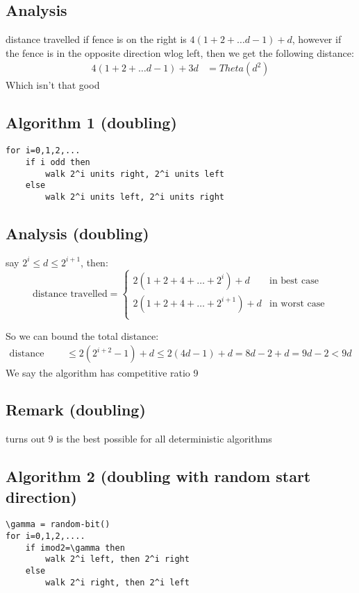 \documentclass[english,12pt]{article}
\theoremstyle{plain}
\theoremstyle{definition}
\theoremstyle{definition} %
\begin{document}
\subsection{Analysis}
distance travelled if fence is on the right is $4(1+2+\ldots d-1) +d$, however if the fence is in the opposite direction wlog left, then we get the following distance:
\begin{align*}
4(1+2+\ldots d-1) +3d &=Theta(d^2)
\end{align*}
Which isn't that good

\subsection{Algorithm 1 (doubling)}
\begin{verbatim}
for i=0,1,2,...
    if i odd then
        walk 2^i units right, 2^i units left
    else
        walk 2^i units left, 2^i units right
\end{verbatim}

\subsection{Analysis (doubling)}
say $2^i\le d\le 2^{i+1}$, then:
\[\text{distance travelled} = \begin{cases}
2(1+2+4+\ldots + 2^i)+d & \text{in best case}\\
2(1+2+4+\ldots + 2^{i+1})+d & \text{in worst case}\\
\end{cases}\]

So we can bound the total distance:
\begin{align*}
\text{distance travelled} &\le 2(2^{i+2} - 1) + d
\le 2(4d-1) + d
=8d-2+d = 9d-2 < 9d
\end{align*}
We say the algorithm has competitive ratio 9
\subsection{Remark (doubling)}
turns out 9 is the best possible for all deterministic algorithms

\subsection{Algorithm 2 (doubling with random start direction)}
\begin{verbatim}
\gamma = random-bit()
for i=0,1,2,....
    if imod2=\gamma then
        walk 2^i left, then 2^i right
    else
        walk 2^i right, then 2^i left
\end{verbatim}  
\end{document}
